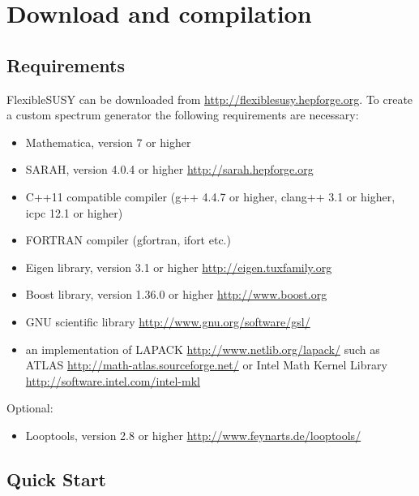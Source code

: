 \documentclass[final,3p,11pt,pdflatex]{elsarticle}
\makeatletter
\newcommand{\fs}{FlexibleSUSY\@\xspace}
\newcommand{\mathematica}{Mathematica\xspace}
\makeatother
\begin{document}
\section{Download and compilation}
\label{sec:download}

\subsection{Requirements}

\fs can be downloaded from \url{http://flexiblesusy.hepforge.org}.  To
create a custom spectrum generator the following requirements are
necessary:
%
\begin{itemize}
\item \mathematica, version 7 or higher
\item SARAH, version 4.0.4 or higher \url{http://sarah.hepforge.org}
\item C++11 compatible compiler (g++ 4.4.7 or higher, clang++ 3.1 or
  higher, icpc 12.1 or higher)
\item FORTRAN compiler (gfortran, ifort etc.)
\item Eigen library, version 3.1 or higher
  \url{http://eigen.tuxfamily.org}
\item Boost library, version 1.36.0 or higher
  \url{http://www.boost.org}
\item GNU scientific library \url{http://www.gnu.org/software/gsl/}
\item an implementation of LAPACK \url{http://www.netlib.org/lapack/}
  such as ATLAS \url{http://math-atlas.sourceforge.net/} or
  Intel Math Kernel Library \url{http://software.intel.com/intel-mkl}
\end{itemize}
%
Optional:
%
\begin{itemize}
\item Looptools, version 2.8 or higher
  \url{http://www.feynarts.de/looptools/}
\end{itemize}

\subsection{Quick Start}
\end{document}
